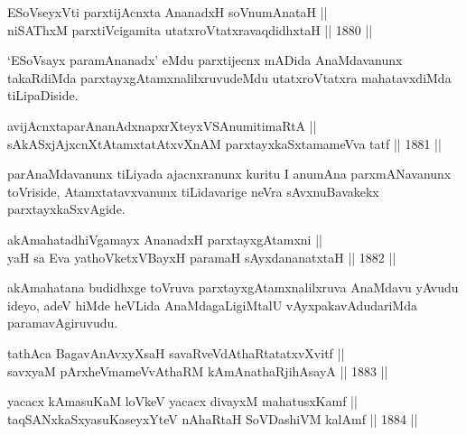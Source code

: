 \begin{shl}
ESoV\s seyxVti parxtijAcnxta AnanadxH soV\s numAnataH || \\
niSAThxM parxtiVcigamita utatxroVtatxravaqdidhxtaH \hfill || 1880 ||
  
\end{shl}

\begin{artha}
`ESoV\s sayx paramAnanadx' eMdu parxtijecnx mADida AnaMdavanunx takaRdiMda
parxtayxgAtamxnalilxruvudeMdu utatxroVtatxra mahatavxdiMda tiLipaDiside.
\end{artha}


\begin{shl}
avijAcnxtaparAnanAdxnapxrXteyxVSA\s numitimaRtA ||  \\
sAkASxjAjxcnXtAtamxtatAtxvXnAM parxtayxkaSxtamameVva tatf \hfill || 1881 ||
  
\end{shl}

\begin{artha}
parAnaMdavanunx tiLiyada ajacnxranunx kuritu I anumAna parxmANavanunx
toVriside, Atamxtatavxvanunx tiLidavarige neVra sAvxnuBavakekx parxtayxkaSxvAgide.
\end{artha}


\begin{shl}
akAmahatadhiVgamayx AnanadxH parxtayxgAtamxni || \\
yaH sa Eva yathoVketxVBayxH paramaH sAyxdananatxtaH \hfill || 1882 ||
  
\end{shl}

\begin{artha}
akAmahatana budidhxge toVruva parxtayxgAtamxnalilxruva AnaMdavu yAvudu
ideyo, adeV hiMde heVLida AnaMdagaLigiMtalU vAyxpakavAdudariMda
paramavAgiruvudu.
\end{artha}


\begin{shl}
tathAca BagavAnAvxyXsaH savaRveVdAthaRtatatxvXvitf || \\
savxyaM pArxheVmameVvAthaRM kAmAnathaRjihAsayA \hfill || 1883 ||
  
\end{shl}

\begin{shl}
yacacx kAmasuKaM loVkeV yacacx divayxM mahatusxKamf || \\
taqSANxkaSxyasuKaseyxYteV nAhaRtaH SoVDashiVM kalAmf \hfill || 1884 ||
  
\end{shl}

